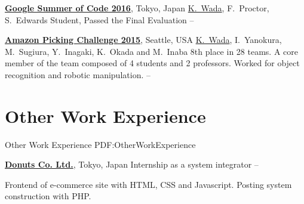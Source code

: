 \documentclass[letterpaper,MMMyyyy,nonstop]{simpleresumecv}
\begin{document}
\begin{body}
\href{https://summerofcode.withgoogle.com/archive/2016/projects/4547228978905088/}
{\textbf{Google Summer of Code 2016}},
Tokyo, Japan
\GapNoBreak
\BulletItem
\underline{K.~Wada}, F.~Proctor, S.~Edwards
\BulletItem
Student, Passed the Final Evaluation
\hfill
{} --

\href{https://www.amazonrobotics.com/#/pickingchallenge}
{\textbf{Amazon Picking Challenge 2015}},
Seattle, USA
\GapNoBreak
\BulletItem
\underline{K.~Wada}, I.~Yanokura, M.~Sugiura, Y.~Inagaki, K.~Okada and M.~Inaba
\BulletItem
8th place in 28 teams.
\BulletItem
A core member of the team composed of 4 students and 2 professors.
\BulletItem
Worked for object recognition and robotic manipulation.
\hfill
{} --


%
%


\section
{Other Work\newline
Experience}
{Other Work Experience}
{PDF:OtherWorkExperience}

\href{http://www.donuts.ne.jp}
{\textbf{Donuts Co. Ltd.}},
Tokyo, Japan
\GapNoBreak
\BulletItem
Internship as a system integrator
\hfill
{} --
\begin{detail}
\SubBulletItem
Frontend of e-commerce site with HTML, CSS and Javascript.
\SubBulletItem
Posting system construction with PHP.
\end{detail}


\end{body}
\end{document}

